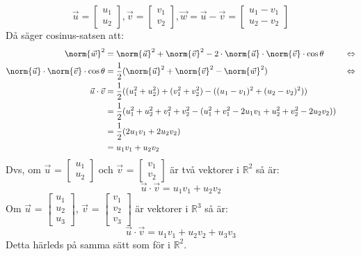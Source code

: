 \[
    \vec{u} = \begin{bmatrix} u_1 \\ u_2 \end{bmatrix}, \vec{v} = \begin{bmatrix} v_1 \\ v_2 \end{bmatrix}, \vec{w} = \vec{u} - \vec{v} = \begin{bmatrix} u_1 - v_1 \\ u_2 - v_2 \end{bmatrix}
\]
\noindent
Då säger cosinus-satsen att:
\begin{alignat*}{3}
    \norm{\vec{w}}^2 &= \norm{\vec{u}}^2 + \norm{\vec{v}}^2 - 2 \cdot \norm{\vec{u}} \cdot \norm{\vec{v}} \cdot \cos{\theta} &&\Leftrightarrow\\
    \norm{\vec{u}} \cdot \norm{\vec{v}} \cdot \cos{\theta} &= \frac{1}{2} (\norm{\vec{u}}^2 + \norm{\vec{v}}^2 - \norm{\vec{w}}^2) &&\Leftrightarrow \\ 
    \vec{u} \cdot \vec{v} &= \frac{1}{2} ((u_1^2 + u_2^2) + (v_1^2 + v_2^2) - ((u_1-v_1)^2 + (u_2-v_2)^2)) \\
    &= \frac{1}{2} (u_1^2+u_2^2+v_1^2+v_2^2 - (u_1^2+v_1^2 - 2u_1v_1+u_2^2+v_2^2-2u_2v_2)) \\
    &= \frac{1}{2} (2u_1v_1 + 2u_2v_2)\\
    &= u_1v_1 + u_2v_2
\end{alignat*}
Dvs, om $\vec{u}$ = $\begin{bmatrix} u_1 \\ u_2 \end{bmatrix}$ och $\vec{v}$ = $\begin{bmatrix} v_1 \\ v_2 \end{bmatrix}$ är två vektorer i $\mathbb{R}^2$ så är:
\begin{equation}
    \vec{u} \cdot \vec{v} = u_1v_1 + u_2v_2
\end{equation}
Om $\vec{u}$ = $\begin{bmatrix} u_1 \\ u_2  \\ u_3 \end{bmatrix}$, $\vec{v}$ = $\begin{bmatrix} v_1 \\v_2\\v_3 \end{bmatrix}$ är vektorer i $\mathbb{R}^3$ så är:
\begin{equation}
  \vec{u} \cdot \vec{v} = u_1v_1 + u_2v_2 + u_3v_3      
\end{equation}
Detta härleds på samma sätt som för i $\mathbb{R}^2$.


